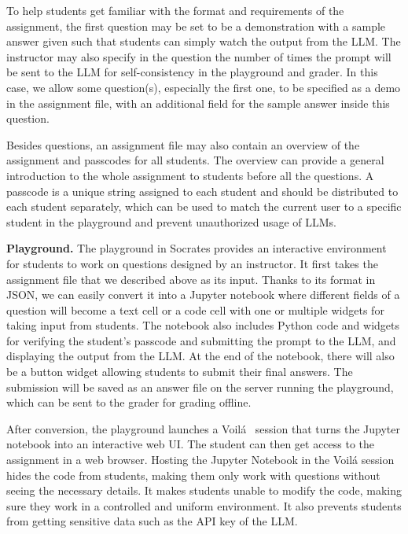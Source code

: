 \documentclass{article} %
\begin{document}
To help students get familiar with the format and requirements of the
assignment, the first question may be set to be a demonstration with a sample answer
given such that students can simply watch the output from the LLM. The instructor may also specify in the question the number of times the prompt will be sent to the LLM for self-consistency in the playground and grader. In this case, we
allow some question(s), especially the first one, to be specified as a demo in
the assignment file, with an additional field for the sample answer inside this
question.

Besides questions, an assignment file may also contain an overview of the
assignment and passcodes for all students. The overview can provide a general
introduction to the whole assignment to students before all the questions.  A
passcode is a unique string assigned to each student and should be distributed to each
student separately, which can be used to match the current user to a specific
student in the playground and prevent unauthorized usage of LLMs.



\textbf{Playground.}
The playground in \textsf{Socrates} provides an interactive environment for
students to work on questions designed by an instructor. It first takes the
assignment file that we described above as its input. Thanks to its format in
JSON, we can easily convert it into a Jupyter notebook where different fields of
a question will become a text cell or a code cell with one or multiple widgets
for taking input from students. The notebook also includes Python code and
widgets for verifying the student's passcode and submitting the prompt to the
LLM, and displaying the output from the LLM. At the end of the notebook, there
will also be a button widget allowing students to submit their final answers. The
submission will be saved as an answer file on the server running the playground,
which can be sent to the grader for grading offline.

After conversion, the playground launches a Voil\'a~\citep{voila} session that
turns the Jupyter notebook into an interactive web UI. The student can then get
access to the assignment in a web browser.  Hosting the Jupyter Notebook in the
Voil\'a session hides the code from students, making them only work with
questions without seeing the necessary details. It makes students unable to modify
the code, making sure they work in a controlled and uniform environment.  It
also prevents students from getting sensitive data such as the API key of the
LLM.
\end{document}
